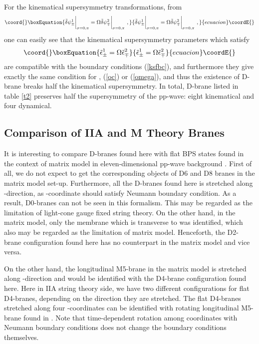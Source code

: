 \documentclass[a4paper,12pt]{article}
\begin{document}
For the kinematical supersymmetry transformations, from 
\begin{equation}\coord{}\boxEquation{
\tilde{\delta} \psi^1_\pm \bigg|_{\sigma =0, \pi}
= \Omega \tilde{\delta} \psi^2_\mp \bigg|_{\sigma=0,\pi} ~,
\label{ksfbc}
}{
\tilde{\delta} \psi^1_\pm \bigg|_{\sigma =0, \pi}
= \Omega \tilde{\delta} \psi^2_\mp \bigg|_{\sigma=0,\pi} ~,
}{ecuacion}\coordE{}\end{equation}
one can easily see that the kinematical supersymmetry parameters
which satisfy 
\begin{equation}\coord{}\boxEquation{
\tilde{\epsilon}^1_\pm = \Omega \tilde{\epsilon}^2_\mp
}{
\tilde{\epsilon}^1_\pm = \Omega \tilde{\epsilon}^2_\mp
}{ecuacion}\coordE{}\end{equation}
are compatible with the boundary conditions (\ref{ksfbc}), and
furthermore they give exactly the same condition for \myHighlight{$\Omega$}\coordHE{},
(\ref{oc}) or (\ref{omega}), and thus the existence of D-brane breaks
half the kinematical supersymmetry.  In total, D-brane listed in table
\ref{t2} preserves half the supersymmetry of the pp-wave: eight
kinematical and four dynamical.

\subsection{Comparison of IIA and M Theory Branes} 
It is interesting to compare D-branes found here with flat BPS states found 
in the context of matrix model in eleven-dimensional pp-wave background
\cite{hyu090}.
First of all, we do not expect to get the corresponding objects of 
D6 and D8 branes in the
matrix model set-up\cite{ban157}. 
Furthermore, all the D-branes found here is stretched along 
\coordHE{}-direction, as \coordHE{}-coordinate should satisfy Neumann boundary 
condition. As a result, D0-branes can not be seen in this formalism.
This may be regarded as the limitation of light-cone gauge fixed 
string theory. On the other hand, in the matrix model, only the
 membrane which is transverse to \coordHE{} was identified, which 
also may be regarded 
as the limitation of matrix model. Henceforth, the D2-brane configuration 
found here has no counterpart in the matrix model and vice versa. 

On the 
other hand, the longitudinal M5-brane in the matrix model 
is stretched along
\coordHE{}-direction and would be identified with the D4-brane configuration 
found here. Here in IIA string theory side, 
we have two different configurations for flat D4-branes, 
depending on the direction they are stretched.      
The flat D4-branes stretched along four \coordHE{}-coordinates can be 
identified with rotating longitudinal M5-brane found in \cite{hyu090}. Note 
that time-dependent rotation among coordinates with Neumann boundary 
conditions does not change the boundary conditions themselves. 
\end{document}

